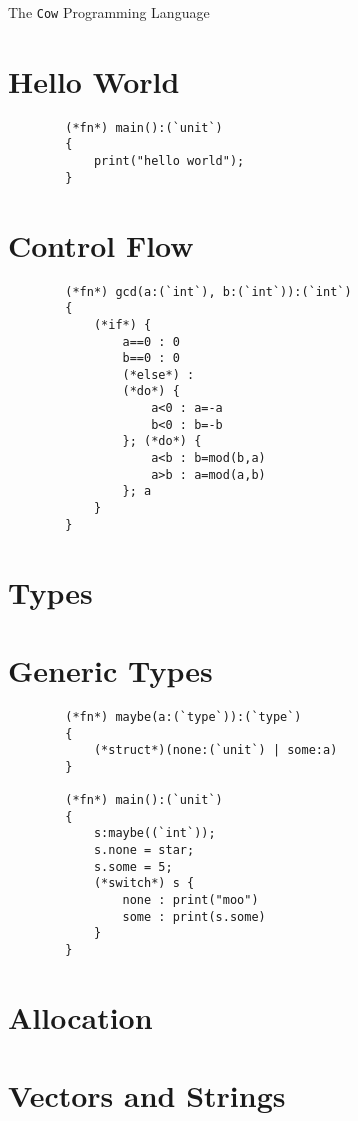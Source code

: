 \documentclass{article}
\begin{document}
\begin{center}
    \LARGE
    The \texttt{Cow} Programming Language
\end{center}
    
\setcounter{section}{-1}
\section{Hello World}

    \begin{lstlisting}
        (*fn*) main():(`unit`)
        {
            print("hello world");
        }
    \end{lstlisting}

\section{Control Flow}

    \begin{lstlisting}
        (*fn*) gcd(a:(`int`), b:(`int`)):(`int`)
        {
            (*if*) {
                a==0 : 0
                b==0 : 0
                (*else*) : 
                (*do*) {
                    a<0 : a=-a
                    b<0 : b=-b
                }; (*do*) {
                    a<b : b=mod(b,a)
                    a>b : a=mod(a,b)
                }; a
            }
        }
    \end{lstlisting}

\section{Types}

\section{Generic Types}

    \begin{lstlisting}
        (*fn*) maybe(a:(`type`)):(`type`)
        {
            (*struct*)(none:(`unit`) | some:a) 
        }

        (*fn*) main():(`unit`)
        {
            s:maybe((`int`));
            s.none = star; 
            s.some = 5; 
            (*switch*) s {
                none : print("moo")  
                some : print(s.some)  
            }
        }
    \end{lstlisting}

\section{Allocation}

\section{Vectors and Strings}
\end{document}
